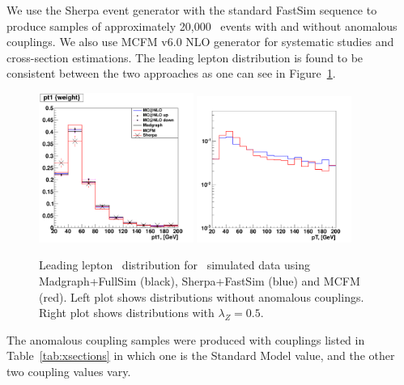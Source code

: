We use the Sherpa event generator with the standard FastSim sequence
to produce samples of approximately 20,000 \ww\ events with and
without anomalous couplings. We also use MCFM v6.0 NLO generator for
systematic studies and cross-section estimations. The leading lepton
distribution is found to be consistent between the two approaches as
one can see in Figure~\ref{fig:generator_comparison}.
\begin{figure}[tp]
  \centerline{
    \includegraphics[width=0.45\textwidth]{figures/generator_comparison.pdf}
    \includegraphics[width=0.45\textwidth]{figures/generator_comparison_atgc.pdf}
  }

  \caption[Generator comparison]{Leading lepton \pt\ distribution
  for \WW\ simulated data using Madgraph+FullSim (black),
  Sherpa+FastSim (blue) and MCFM (red). Left plot shows distributions
  without anomalous couplings. Right plot shows distributions with
  $\lambda_{Z}=0.5$.}

  \label{fig:generator_comparison}
\end{figure}

The anomalous coupling samples were produced with couplings listed in
Table~\ref{tab:xsections} in which one is the Standard Model value,
and the other two coupling values vary.
